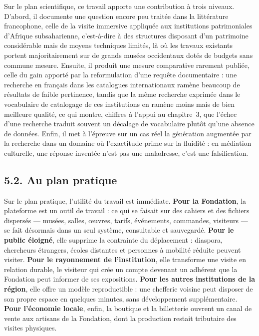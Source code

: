 Sur le plan scientifique, ce travail apporte une contribution à trois niveaux.
D'abord, il documente une question encore peu traitée dans la littérature
francophone, celle de la visite immersive appliquée aux institutions
patrimoniales d'Afrique subsaharienne, c'est-à-dire à des structures disposant
d'un patrimoine considérable mais de moyens techniques limités, là où les
travaux existants portent majoritairement sur de grands musées occidentaux dotés
de budgets sans commune mesure. Ensuite, il produit une mesure comparative
rarement publiée, celle du gain apporté par la reformulation d'une requête
documentaire : une recherche en français dans les catalogues internationaux
ramène beaucoup de résultats de faible pertinence, tandis que la même recherche
exprimée dans le vocabulaire de catalogage de ces institutions en ramène moins
mais de bien meilleure qualité, ce qui montre, chiffres à l'appui au
chapitre~3, que l'échec d'une recherche traduit souvent un décalage de
vocabulaire plutôt qu'une absence de données. Enfin, il met à l'épreuve sur un
cas réel la génération augmentée par la recherche dans un domaine où l'exactitude
prime sur la fluidité : en médiation culturelle, une réponse inventée n'est pas
une maladresse, c'est une falsification.

\subsection*{5.2. Au plan pratique}

Sur le plan pratique, l'utilité du travail est immédiate. \textbf{Pour la
Fondation}, la plateforme est un outil de travail : ce qui se faisait sur des
cahiers et des fichiers dispersés — musées, salles, œuvres, tarifs, événements,
commandes, visiteurs — se fait désormais dans un seul système, consultable et
sauvegardé. \textbf{Pour le public éloigné}, elle supprime la contrainte du
déplacement : diaspora, chercheurs étrangers, écoles distantes et personnes à
mobilité réduite peuvent visiter. \textbf{Pour le rayonnement de
l'institution}, elle transforme une visite en relation durable, le visiteur qui
crée un compte devenant un adhérent que la Fondation peut informer de ses
expositions. \textbf{Pour les autres institutions de la région}, elle offre un
modèle reproductible : une chefferie voisine peut disposer de son propre espace
en quelques minutes, sans développement supplémentaire. \textbf{Pour l'économie
locale}, enfin, la boutique et la billetterie ouvrent un canal de vente aux
artisans de la Fondation, dont la production restait tributaire des visites
physiques.

